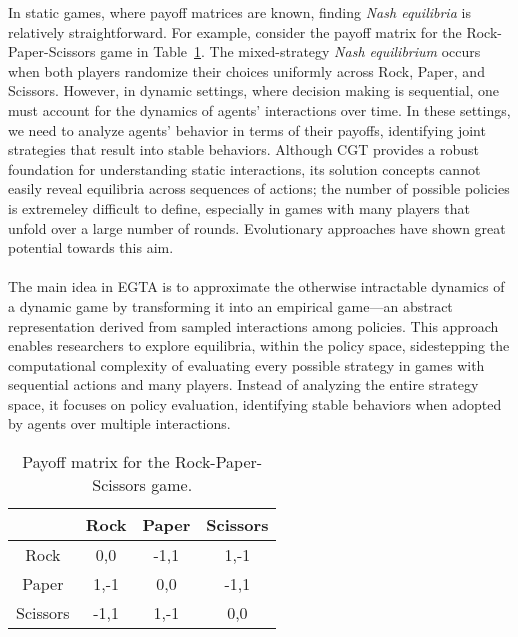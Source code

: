 \begin{flushleft}
    In static games, where payoff matrices are known, finding \emph{Nash equilibria} is relatively straightforward. For example, consider the payoff matrix for the Rock-Paper-Scissors game in Table~\ref{tab:rps_payoff}. The mixed-strategy \emph{Nash equilibrium} occurs when both players randomize their choices uniformly across Rock, Paper, and Scissors. However, in dynamic settings, where decision making is sequential, one must account for the dynamics of agents' interactions over time. In these settings, we need to analyze agents' behavior in terms of their payoffs, identifying joint strategies that result into stable behaviors. Although CGT provides a robust foundation for understanding static interactions, its solution concepts cannot easily reveal equilibria across sequences of actions; the number of possible policies is extremeley difficult to define, especially in games with many players that unfold over a large number of rounds. Evolutionary approaches have shown great potential towards this aim.\\~\\

    The main idea in EGTA is to approximate the otherwise intractable dynamics of a dynamic game by transforming it into an empirical game—an abstract representation derived from sampled interactions among policies. This approach enables researchers to explore equilibria, within the policy space, sidestepping the computational complexity of evaluating every possible strategy in games with sequential actions and many players. Instead of analyzing the entire strategy space, it focuses on policy evaluation, identifying stable behaviors when adopted by agents over multiple interactions.

    \begin{table}[t]
        \centering
        \caption{Payoff matrix for the Rock-Paper-Scissors game.}
        \vspace{0.6em}
        \label{tab:rps_payoff}
        \begin{tabular}{c|c c c}
            & Rock & Paper & Scissors \\ \hline
            Rock     & 0,0    & -1,1   & 1,-1 \\
            Paper    & 1,-1   & 0,0    & -1,1 \\
            Scissors & -1,1   & 1,-1   & 0,0 \\
        \end{tabular}
    \end{table}
    
\end{flushleft}

